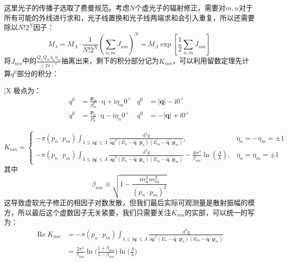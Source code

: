 这里光子的传播子选取了费曼规范。考虑$N$个虚光子的辐射修正，需要对$m,n$对于所有可能的外线进行求和，光子线置换和光子线两端求和会引入重复，所以还需要除以$N!2^N$因子：
\begin{equation}
	M_{\lambda}=M_\Lambda\cdot\frac{1}{N!2^N}\left(\sum_{n,m}J_{nm}\right)^N=M_{\Lambda}\exp\left[\frac{1}{2}\sum_{n,m}J_{nm}\right]
\end{equation}
将$J_{mn}$中的$\frac{Q_nQ_m\eta_n\eta_m}{(2\pi)^4}$抽离出来，剩下的积分部分记为$K_{mn}$，可以利用留数定理先计算$q^0$部分的积分：\begin{margintable}\footnotesize 
	\begin{tabularx}{\marginparwidth}{|X}
		极点为：
		\[\begin{aligned}q^0&=\frac{\mathbf{p}_m}{p_m^0}\cdot\mathrm{q}+\mathrm{i}\eta_m 0^+&q^0&=|\mathbf{q}|-\mathrm{i} 0^+\\q^0&=\frac{\mathbf{p}_n}{p_n^0}\cdot\mathrm{q}-\mathrm{i}\eta_n 0^+&q^0&=-|\mathbf{q}|+\mathrm{i} 0^+\end{aligned}\]
	\end{tabularx}
\end{margintable}
\begin{equation}
	K_{nm}=\begin{cases}
		-\pi(p_n\cdot p_m)\int_{\lambda\leq|\mathbf{q}|\leq\Lambda}\frac{\mathrm{d}^3q}{\left|\mathbf{q}\right|^3(E_n-\mathbf{\hat{q}}\cdot\mathbf{p}_n)(E_m-\mathbf{\hat{q}}\cdot\mathbf{p}_m)},&\eta_n=-\eta_m=\pm1\\
		-\pi(p_n\cdot p_m)\int_{\lambda\leq|\mathbf{q}|\leq\Lambda}\frac{\mathrm{d}^3q}{|\mathbf{q}|^3(E_n-\mathbf{\hat{q}}\cdot\mathbf{p}_n)(E_m-\mathbf{\hat{q}}\cdot\mathbf{p}_m)}-\frac{4\mathrm{i}\pi^3}{\beta_{nm}}\ln\left(\frac{\Lambda}{\lambda}\right),&\eta_n=\eta_m=\pm1
	\end{cases}
\end{equation}
其中
\[\beta_{nm}\equiv\sqrt{1-\frac{m_n^2m_m^2}{(p_n\cdot p_m)^2}}\]
这导致虚软光子修正的相因子对数发散，但我们最后实际可观测量是散射振幅的模方，所以最后这个虚数因子无关紧要，我们只需要关注$K_{nm}$的实部，可以统一的写为：
\begin{equation}
	\begin{aligned}
	\operatorname{Re}K_{mn}&=-\pi(p_n\cdot p_m)\int_{\lambda\leq|\mathbf{q}|\leq\Lambda}\frac{\mathrm{d}^3q}{|\mathbf{q}|^3(E_n-\mathbf{\hat{q}}\cdot\mathbf{p}_n)(E_m-\mathbf{\hat{q}}\cdot\mathbf{p}_m)}\\
	&=\frac{2\pi^2}{\beta_{nm}}\ln\biggl(\frac{1+\beta_{nm}}{1-\beta_{nm}}\biggr)\ln\biggl(\frac{\Lambda}{\lambda}\biggr)
	\end{aligned}
\end{equation}
